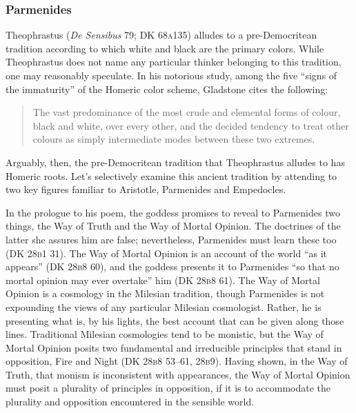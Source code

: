 \begin{frame}[t]\frametitle{Parmenides}
	
\end{frame}

Theophrastus (\emph{De Sensibus} 79; DK 68\textsc{a}135) alludes to a pre-Democritean tradition according to which white and black are the primary colors. While Theo\-phra\-stus does not name any particular thinker belonging to this tradition, one may reasonably speculate. In his notorious study, among the five ``signs of the immaturity'' of the Homeric color scheme, Gladstone cites the following:  
\begin{quote}
    The vast predominance of the most crude and elemental forms of colour, black and white, over every other, and the decided tendency to treat other colours as simply intermediate modes between these two extremes. 
\end{quote}
Arguably, then, the pre-De\-mo\-cri\-tean tradition that Theophrastus alludes to has Homeric roots. Let's selectively examine this ancient tradition by attending to two key figures familiar to Aristotle, Parmenides and Empedocles.

In the prologue to his poem, the goddess promises to reveal to Parmenides two things, the Way of Truth and the Way of Mortal Opinion. The doctrines of the latter she assures him are false; nevertheless, Parmenides must learn these too (DK 28\textsc{b}1 31). The Way of Mortal Opinion is an account of the world ``as it appears'' (DK 28\textsc{b}8 60), and the goddess presents it to Parmenides ``so that no mortal opinion may ever overtake'' him (DK 28\textsc{b}8 61). The Way of Mortal Opinion is a cosmology in the Milesian tradition, though Parmenides is not expounding the views of any particular Milesian cosmologist. Rather, he is presenting what is, by his lights, the best account that can be given along those lines. Traditional Milesian cosmologies tend to be monistic, but the Way of Mortal Opinion posits two fundamental and irreducible principles that stand in opposition, Fire and Night (DK 28\textsc{b}8 53--61, 28\textsc{b}9). Having shown, in the Way of Truth, that monism is inconsistent with appearances, the Way of Mortal Opinion must posit a plurality of principles in opposition, if it is to accommodate the plurality and opposition encountered in the sensible world.

